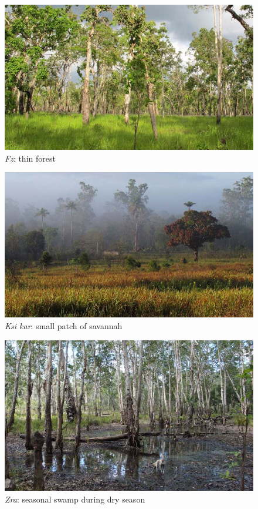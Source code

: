\begin{figure}
    \includegraphics[trim={0 0.3cm 0 0.3cm}, clip=true, width=.9\textwidth]{figures/landscape4.jpg}
  \caption[\emph{Fz}: thin forest]{\emph{Fz}: thin forest}
  \label{fig:landscape4}
\end{figure}

\begin{figure}
    \includegraphics[width=.9\textwidth]{figures/landscape5.jpg}
  \caption[\emph{Ksi kar}: small patch of savannah]{\emph{Ksi kar}: small patch of savannah}
  \label{fig:landscape5}
\end{figure}

\begin{figure}
    \includegraphics[width=.9\textwidth]{figures/landscape6.jpg}
  \caption[\emph{Zra}: seasonal swamp during dry season]{\emph{Zra}: seasonal swamp during dry season}
  \label{fig:landscape6}
\end{figure}

